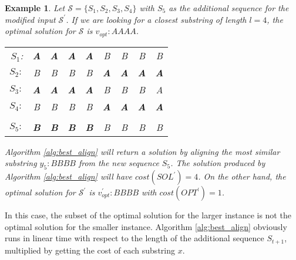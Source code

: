 \documentclass[journal]{acm_proc_article-sp}
\newtheorem{example}{Example}
\begin{document}
\begin{example} \label{ex:1}
Let $\mathcal{S} = \{S_1, S_2, S_3, S_4 \}$ with $S_5$ as the additional sequence for the modified input $\mathcal{S}^\prime$. If we are looking for a closest substring of length $l = 4$, the optimal solution for $\mathcal{S}$ is  $v_{opt}: AAAA $.  

\begin{center}
\begin{tabular}{ r  c c c c c c c c}
$S_1$: &  {\bf A} & {\bf A} & {\bf A} & {\bf A} & B & B & B & B \\
$S_2:$ & B & B & B & B &  {\bf A} & {\bf A} & {\bf A} & {\bf A}  \\
$S_3: $ & {\bf A} & {\bf A} & {\bf A} & {\bf A} & B & B & B & A \\
$S_4:$ & B & B & B & B &  {\bf A} & {\bf A} & {\bf A} & {\bf A}  \\ \\

$S_5: $ &  {\bf B} & {\bf B} & {\bf B} & {\bf B} & B & B & B & B \\
\end{tabular}
\end{center}

Algorithm \ref{alg:best_align} will return a solution by aligning the most similar substring $y_5: BBBB$ from the new sequence $S_5$. The solution produced by Algorithm \ref{alg:best_align} will have $cost(SOL^\prime) = 4$. On the other hand,  the optimal solution for $\mathcal{S}^\prime$ is $v^\prime_{opt}: BBBB$ with $cost(OPT^\prime) = 1$. 
\end{example}

In this case, the subset of the optimal solution for the larger instance is not the optimal solution for the smaller instance.  Algorithm \ref{alg:best_align} obviously runs in linear time with respect to the length of the additional sequence $ S_{t+1}$, multiplied by getting the cost of each substring $x$. 
\end{document}
